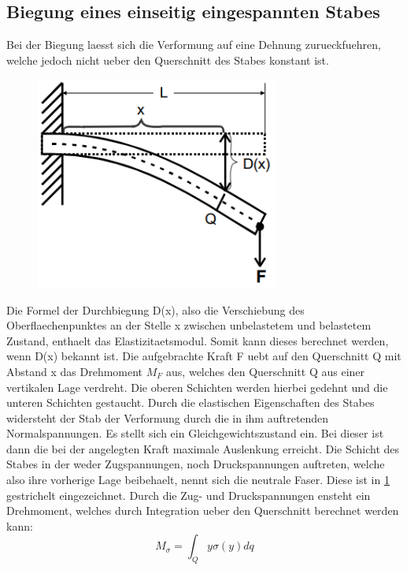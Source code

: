 \subsection{Biegung eines einseitig eingespannten Stabes}
Bei der Biegung laesst sich die Verformung auf eine Dehnung zurueckfuehren, welche jedoch nicht ueber den Querschnitt des Stabes konstant ist. 
\begin{figure}[H]
    \centering
    \captionsetup{justification=centering}
    \includegraphics[height=7cm]{"Einseitig_Biegung.png"}
    \label{Fig:Einseitig}
\end{figure}
Die Formel der Durchbiegung D(x), also die Verschiebung des Oberflaechenpunktes an der Stelle x zwischen unbelastetem und belastetem Zustand, enthaelt das Elastizitaetsmodul. Somit kann dieses berechnet werden, wenn D(x) bekannt ist. Die aufgebrachte Kraft F uebt auf den Querschnitt Q mit Abstand x das Drehmoment $M_F$ aus, welches den Querschnitt Q aus einer vertikalen Lage verdreht. Die oberen Schichten werden hierbei gedehnt und die unteren Schichten gestaucht. Durch die elastischen Eigenschaften des Stabes widersteht der Stab der Verformung durch die in ihm auftretenden Normalspannungen. Es stellt sich ein Gleichgewichtszustand ein. Bei dieser ist dann die bei der angelegten Kraft maximale Auslenkung erreicht. Die Schicht des Stabes in der weder Zugspannungen, noch Druckspannungen auftreten, welche also ihre vorherige Lage beibehaelt, nennt sich die neutrale Faser. Diese ist in \ref{Fig:Einseitig} gestrichelt eingezeichnet.
Durch die Zug- und Druckspannungen ensteht ein Drehmoment, welches durch Integration ueber den Querschnitt berechnet werden kann:
\begin{equation}
    M_{\sigma}=\int_Qy\sigma(y)dq
\end{equation}
